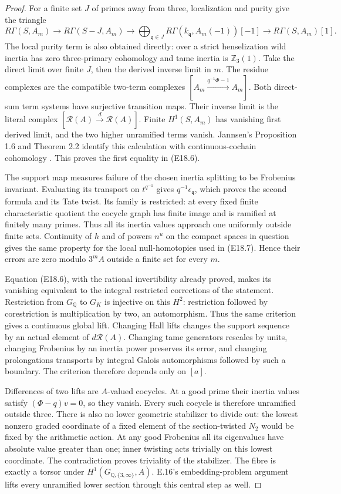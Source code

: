 \documentclass[11pt,oneside]{article}
\begin{document}
\begin{proof}
For a finite set $J$ of primes away from three,
localization and purity give the triangle
\[
 R\Gamma(S,A_m)\longrightarrow
 R\Gamma(S-J,A_m)\longrightarrow
 \bigoplus_{\mathfrak q\in J}
 R\Gamma(k_{\mathfrak q},A_m(-1))[-1]
 \longrightarrow R\Gamma(S,A_m)[1].
 \tag{E18.7}
\]
The local purity term is also obtained directly:
over a strict henselization wild inertia has zero
three-primary cohomology and tame inertia is
$\mathbb Z_3(1)$. Take the direct limit over finite
$J$, then the derived inverse limit in $m$.
The residue complexes are the compatible two-term
complexes $[A_m\xrightarrow{q^{-1}\Phi-1}A_m]$.
Both direct-sum term systems have surjective
transition maps. Their inverse limit is the literal
complex $[\mathcal R(A)\xrightarrow d\mathcal R(A)]$.
Finite $H^1(S,A_m)$ has vanishing first derived
limit, and the two higher unramified terms vanish.
Jannsen's Proposition 1.6 and Theorem 2.2 identify
this calculation with continuous-cochain cohomology
\cite{Jannsen1988}. This proves the first equality
in (E18.6).

The support map measures failure of the chosen
inertia splitting to be Frobenius invariant.
Evaluating its transport on $t^{q^{-1}}$ gives
$q^{-1}\epsilon_{\mathfrak q}$, which proves the
second formula and its Tate twist. Its family is
restricted: at every fixed finite characteristic
quotient the cocycle graph has finite image and
is ramified at finitely many primes. Thus all its
inertia values approach one uniformly outside
finite sets. Continuity of $h$ and of powers
$n^u$ on the compact spaces in question gives
the same property for the local null-homotopies
used in (E18.7). Hence their errors are zero
modulo $3^mA$ outside a finite set for every $m$.

Equation (E18.6), with the rational invertibility
already proved, makes its vanishing equivalent
to the integral restricted corrections of the
statement. Restriction from $G_{\mathbb Q}$ to
$G_K$ is injective on this $H^2$: restriction
followed by corestriction is multiplication by
two, an automorphism. Thus the same criterion
gives a continuous global lift. Changing Hall
lifts changes the support sequence by an actual
element of $d\mathcal R(A)$. Changing tame
generators rescales by units, changing Frobenius
by an inertia power preserves its error, and
changing prolongations transports by integral
Galois automorphisms followed by such a boundary.
The criterion therefore depends only on $[a]$.

Differences of two lifts are $A$-valued cocycles.
At a good prime their inertia values satisfy
$(\Phi-q)v=0$, so they vanish. Every such
cocycle is therefore unramified outside three.
There is also no lower geometric stabilizer
to divide out: the lowest nonzero graded
coordinate of a fixed element of the
section-twisted $N_2$ would be fixed by the
arithmetic action. At any good Frobenius all
its eigenvalues have absolute value greater
than one; inner twisting acts trivially on
this lowest coordinate. The contradiction
proves triviality of the stabilizer. The fibre
is exactly a torsor under $H^1(G_{\mathbb Q,\{3,\infty\}},A)$.
E.16's embedding-problem argument lifts every
unramified lower section through this central
step as well.


\end{proof}
\end{document}
